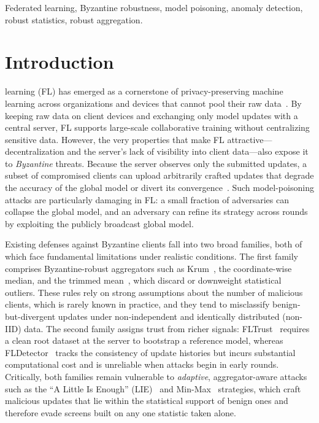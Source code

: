 \documentclass[journal]{IEEEtran}
\begin{document}
\begin{IEEEkeywords}
Federated learning, Byzantine robustness, model poisoning, anomaly detection, robust statistics, robust aggregation.
\end{IEEEkeywords}

\section{Introduction}
\label{sec:introduction}


 learning (FL) has emerged as a cornerstone of privacy-preserving machine learning across organizations and devices that cannot pool their raw data~\cite{sandeepa2025federated}. By keeping raw data on client devices and exchanging only model updates with a central server, FL supports large-scale collaborative training without centralizing sensitive data. However, the very properties that make FL attractive---decentralization and the server's lack of visibility into client data---also expose it to \emph{Byzantine} threats. Because the server observes only the submitted updates, a subset of compromised clients can upload arbitrarily crafted updates that degrade the accuracy of the global model or divert its convergence~\cite{baruch2019little, fang2020local, shejwalkar2021manipulating}. Such model-poisoning attacks are particularly damaging in FL: a small fraction of adversaries can collapse the global model, and an adversary can refine its strategy across rounds by exploiting the publicly broadcast global model.

Existing defenses against Byzantine clients fall into two broad families, both of which face fundamental limitations under realistic conditions. The first family comprises Byzantine-robust aggregators such as Krum~\cite{blanchard2017machine}, the coordinate-wise median, and the trimmed mean~\cite{yin2018byzantine}, which discard or downweight statistical outliers. These rules rely on strong assumptions about the number of malicious clients, which is rarely known in practice, and they tend to misclassify benign-but-divergent updates under non-independent and identically distributed (non-IID) data. The second family assigns trust from richer signals: FLTrust~\cite{cao2020fltrust} requires a clean root dataset at the server to bootstrap a reference model, whereas FLDetector~\cite{zhang2022fldetector} tracks the consistency of update histories but incurs substantial computational cost and is unreliable when attacks begin in early rounds. Critically, both families remain vulnerable to \emph{adaptive}, aggregator-aware attacks such as the ``A Little Is Enough'' (LIE)~\cite{baruch2019little} and Min-Max~\cite{shejwalkar2021manipulating} strategies, which craft malicious updates that lie within the statistical support of benign ones and therefore evade screens built on any one statistic taken alone.
\end{document}
